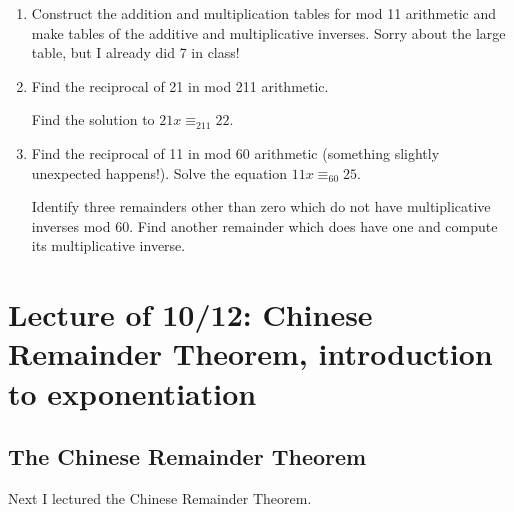 \documentclass[12pt]{article}
\begin{document}
\begin{enumerate}

\item  Construct the addition and multiplication tables for mod 11 arithmetic and make tables of the additive and multiplicative inverses.  Sorry about the large table, but I already did 7 in class!

\item  Find the reciprocal of 21 in  mod 211 arithmetic.  

Find the solution to $21x \equiv_{211} 22$.

\item  Find the reciprocal of 11 in mod 60 arithmetic (something slightly unexpected happens!).  Solve the equation $11x\equiv_{60} 25$.

Identify three remainders other than zero which do not have multiplicative inverses mod 60.  Find another remainder which does have one and compute its multiplicative inverse.

\end{enumerate}

\section{Lecture of 10/12:  Chinese Remainder Theorem, introduction to exponentiation}



\subsection{The Chinese Remainder Theorem}

Next I lectured the Chinese Remainder Theorem.
\end{document}
